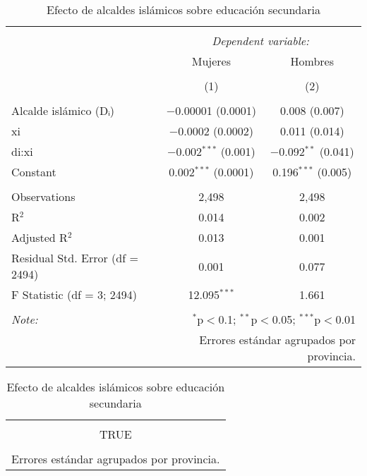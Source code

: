 
\begin{table}[ht!] \centering 
  \caption{Efecto de alcaldes islámicos sobre educación secundaria} 
  \label{tab:rd_mujeres_hombres} 
\begin{tabular}{@{\extracolsep{5pt}}lcc} 
\\[-1.8ex]\hline 
\hline \\[-1.8ex] 
 & \multicolumn{2}{c}{\textit{Dependent variable:}} \\ 
\cline{2-3} 
 & Mujeres & Hombres \\ 
\\[-1.8ex] & (1) & (2)\\ 
\hline \\[-1.8ex] 
 Alcalde islámico (Dᵢ) & $-$0.00001 (0.0001) & 0.008 (0.007) \\ 
  xi & $-$0.0002 (0.0002) & 0.011 (0.014) \\ 
  di:xi & $-$0.002$^{***}$ (0.001) & $-$0.092$^{**}$ (0.041) \\ 
  Constant & 0.002$^{***}$ (0.0001) & 0.196$^{***}$ (0.005) \\ 
 \hline \\[-1.8ex] 
Observations & 2,498 & 2,498 \\ 
R$^{2}$ & 0.014 & 0.002 \\ 
Adjusted R$^{2}$ & 0.013 & 0.001 \\ 
Residual Std. Error (df = 2494) & 0.001 & 0.077 \\ 
F Statistic (df = 3; 2494) & 12.095$^{***}$ & 1.661 \\ 
\hline 
\hline \\[-1.8ex] 
\textit{Note:}  & \multicolumn{2}{r}{$^{*}$p$<$0.1; $^{**}$p$<$0.05; $^{***}$p$<$0.01} \\ 
 & \multicolumn{2}{r}{Errores estándar agrupados por provincia.} \\ 
\end{tabular} 
\end{table} 

\begin{table}[ht!] \centering 
  \caption{Efecto de alcaldes islámicos sobre educación secundaria} 
  \label{tab:rd_mujeres_hombres} 
\begin{tabular}{@{\extracolsep{5pt}} c} 
\\[-1.8ex]\hline 
\hline \\[-1.8ex] 
TRUE \\ 
\hline \\[-1.8ex] 
\multicolumn{1}{l}{Errores estándar agrupados por provincia.} \\ 
\end{tabular} 
\end{table} 
